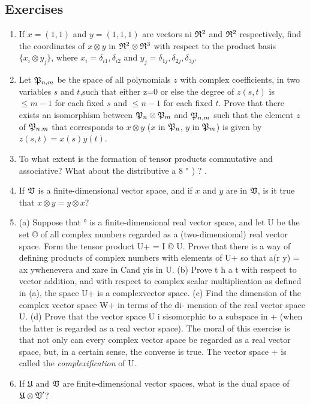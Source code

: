 {\small
\subsection*{Exercises}
\begin{enumerate}[wide]
    \item If \(x = (1, 1)\) and \(y = (1, 1, 1)\) are vectors ni \(\mathfrak{R}^2\)
    and \(\mathfrak{R}^2\) respectively, find the coordinates of \(x \otimes y\) in
    \(\mathfrak{R}^2 \otimes \mathfrak{R}^3\) with respect to the product basis \(\{x_i
    \otimes y_j\}\), where \(x_i = \delta_{i1}, \delta_{i2}\) and \(y_j =
    \delta_{1j}, \delta_{2j}, \delta_{3j}\).
    

    \item Let \(\mathfrak{P}_{n,m}\) be the space of all polynomials \(z\) with
    complex coefficients, in two variables \(s\) and \(t\),such that either z=0
    or else the degree of \(z(s,t)\) is \(\leq m - 1\) for each fixed \(s\) and
    \(\leq n - 1\) for each fixed \(t\). Prove that there exists an isomorphism
    between \(\mathfrak{P}_n \otimes \mathfrak{P}_m\) and \(\mathfrak{P}_{n,m}\) such that
    the element \(z\) of \(\mathfrak{P}_{n.m}\) that corresponds to \(x \otimes y\)
    (\(x\) in \(\mathfrak{P}_n\), \(y\) in \(\mathfrak{P}_m\)) is given by \(z(s,t) =
    x(s) y(t)\).

    \item To what extent is the formation of tensor products commutative and
    associative? What about the distributive a 8 " ) ? .
    
    \item If \(\mathfrak{V}\) is a finite-dimensional vector space, and if \(x\) and
    \(y\) are in \(\mathfrak{V}\), is it true that \(x \otimes y = y \otimes x\)?

    \item (a) Suppose that ° is a finite-dimensional real vector space, and let U be the set © of all complex numbers regarded as a (two-dimensional) real vector space. Form the tensor product U+ = I © U. Prove that there is a way of defining products of complex numbers with elements of U+ so that a(r y) = ax  ywhenevera and xare in Cand yis in U.
    (b) Prove t h a t with respect to vector addition, and with respect to complex scalar multiplication as defined in (a), the space U+ is a complexvector space.
    (c) Find the dimension of the complex vector space W+ in terms of the di-
    mension of the real vector space U.
    (d) Prove that the vector space U i sisomorphic to a subspace in + (when the
    latter is regarded as a real vector space).
    The moral of this exercise is that not only can every complex vector space be
    regarded as a real vector space, but, in a certain sense, the converse is true. The vector space + is called the \emph{complexification} of U.

    
    \item If \(\mathfrak{U}\) and \(\mathfrak{V}\) are finite-dimensional vector spaces, what is the dual space of \(\mathfrak{U} \otimes \mathfrak{V}'\)?
\end{enumerate}
}

